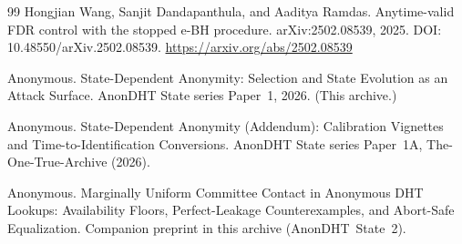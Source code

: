 \documentclass[11pt]{article}
\theoremstyle{definition}
\theoremstyle{remark}
\begin{document}
\begin{thebibliography}{99}
Hongjian Wang, Sanjit Dandapanthula, and Aaditya Ramdas.
\newblock Anytime-valid FDR control with the stopped e-BH procedure.
\newblock arXiv:2502.08539, 2025. DOI: 10.48550/arXiv.2502.08539.
\newblock \url{https://arxiv.org/abs/2502.08539}


Anonymous.
\newblock State-Dependent Anonymity: Selection and State Evolution as an Attack Surface.
\newblock AnonDHT State series Paper~1, 2026. (This archive.)

Anonymous.
\newblock State-Dependent Anonymity (Addendum): Calibration Vignettes and Time-to-Identification Conversions.
\newblock AnonDHT State series Paper~1A, The-One-True-Archive (2026).

Anonymous.
\newblock Marginally Uniform Committee Contact in Anonymous DHT Lookups: Availability Floors, Perfect-Leakage Counterexamples, and Abort-Safe Equalization.
\newblock Companion preprint in this archive (AnonDHT~State~2).

\end{thebibliography}
\end{document}
